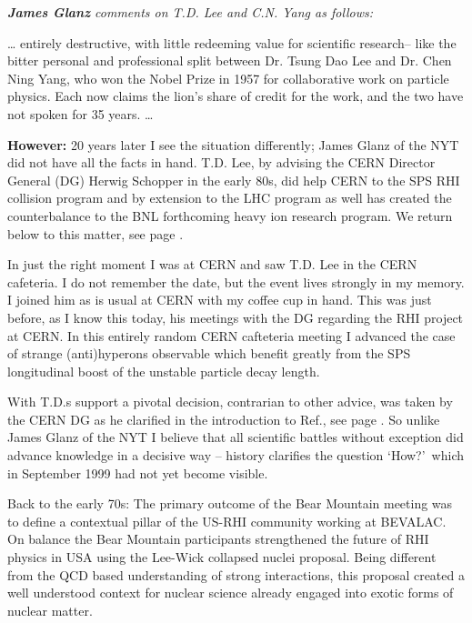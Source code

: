\noindent \textit{\textbf{James Glanz} comments on T.D. Lee and C.N. Yang as follows:}\\[-0.7cm]
%
\begin{mdframed}[linecolor=gray,roundcorner=12pt,backgroundcolor=GreenYellow!15,linewidth=1pt,leftmargin=0cm,rightmargin=0cm,topline=true,bottomline=true,skipabove=12pt]\relax%
% 
\ldots\label{NYT1999} entirely destructive, with little redeeming value for scientific research-- like the bitter personal and professional split between Dr. Tsung Dao Lee and Dr. Chen Ning Yang, who won the Nobel Prize in 1957 for collaborative work on particle physics. Each now claims the lion\rq s share of credit for the work, and the two have not spoken for 35 years. \ldots
\end{mdframed} 
%
{\bf However:} 20 years later I see the situation differently; James Glanz of the NYT did not have all the facts in hand. T.D. Lee, by advising the CERN Director General (DG) Herwig Schopper in the early 80s, did help CERN to the SPS RHI collision program and by extension to the LHC program as well has created the counterbalance to the BNL forthcoming heavy ion research program. We return below to this matter, see page \pageref{SchopperRem}. 

In just the right moment I was at CERN and saw T.D. Lee in the CERN cafeteria. I do not remember the date, but the event lives strongly in my memory. I joined him as is usual at CERN with my coffee cup in hand. This was just before, as I know this today, his meetings with the DG regarding the RHI project at CERN. In this entirely random CERN cafteteria meeting I advanced the case of strange (anti)hyperons observable which benefit greatly from the SPS longitudinal boost of the unstable particle decay length. 

With T.D.s support a pivotal decision, contrarian to other advice, was taken by the CERN DG as he clarified in the introduction to Ref.\cite{Rafelski:2016hnq}, see page \pageref{SchopperRem}. So unlike James Glanz of the NYT I believe that all scientific battles without exception did advance knowledge in a decisive way -- history clarifies the question \lq How?\rq\ which in September 1999 had not yet become visible. 

Back to the early 70s: The primary outcome of the Bear Mountain meeting was to define a contextual pillar of the US-RHI community working at BEVALAC. On balance the Bear Mountain participants strengthened the future of RHI physics in USA using the Lee-Wick collapsed nuclei proposal. Being different from the QCD based understanding of strong interactions, this proposal created a well understood context for nuclear science already engaged into exotic forms of nuclear matter. 

